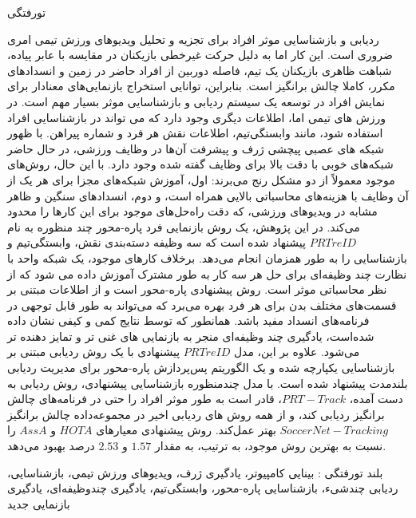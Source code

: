 

\vspace*{-60pt}
\enlargethispage{90pt}


\vspace{-1cm}

‌تورفتگی


ردیابی و ‌‌بازشناسایی موثر افراد برای تجزیه و تحلیل ویدیوهای ورزش تیمی امری ضروری است. این کار اما به دلیل حرکت غیرخطی بازیکنان در مقایسه با عابر پیاده، شباهت ظاهری بازیکنان یک تیم، فاصله دوربین از افراد حاضر در زمین و انسدادهای مکرر، کاملا چالش برانگیز است. بنابراین، توانایی استخراج بازنمایی‌های معنادار برای نمایش افراد در توسعه یک سیستم ردیابی و بازشناسایی موثر بسیار مهم است. در ورزش های تیمی اما، اطلاعات دیگری وجود دارد که می تواند در بازشناسایی افراد استفاده شود، مانند وابستگی‌تیم، اطلاعات نقش هر فرد و شماره پیراهن. با ظهور شبکه های عصبی پیچشی ژرف و پیشرفت آن‌ها در وظایف ورزشی، در حال حاضر شبکه‌های خوبی با دقت بالا برای وظایف گفته شده وجود دارد. با این حال، روش‌های موجود معمولاً از دو مشکل رنج می‌برند: اول، آموزش شبکه‌های مجزا برای هر یک از آن وظایف با هزینه‌های محاسباتی بالایی همراه است، و دوم، انسدادهای سنگین و ظاهر مشابه در ویدیوهای ورزشی، که دقت راه‌حل‌های موجود برای این کارها را محدود می‌کند. در این پژوهش، یک روش بازنمایی فرد پاره-محور چند منظوره به نام $PRTreID$ پیشنهاد شده است که سه وظیفه دسته‌بندی نقش، وابستگی‌تیم و بازشناسایی را به طور همزمان انجام می‌دهد. برخلاف کارهای موجود، یک شبکه واحد با نظارت چند وظیفه‌ای برای حل هر سه کار به طور مشترک آموزش داده می شود که از نظر محاسباتی موثر است. روش پیشنهادی پاره-محور است و از اطلاعات مبتنی بر قسمت‌های مختلف بدن برای هر فرد بهره می‌برد که می‌تواند به طور قابل توجهی در فرنامه‌های انسداد مفید باشد. همانطور که توسط نتایج کمی و کیفی نشان داده شده‌است، یادگیری چند وظیفه‌ای منجر به بازنمایی های غنی تر و تمایز دهنده تر می‌شود. علاوه بر این، مدل $PRTreID$ پیشنهادی با یک روش ردیابی مبتنی بر بازشناسایی یکپارچه شده و یک الگوریتم پس‌پردازش پاره-محور برای مدیریت ردیابی بلند‌مدت پیشنهاد شده است. با مدل چندمنظوره بازشناسایی پیشنهادی، روش ردیابی به دست آمده، $PRT-Track$، قادر است به طور موثر افراد را حتی در فرنامه‌های چالش برانگیز ردیابی کند، و از همه روش های ردیابی اخیر در مجموعه‌داده چالش برانگیز $SoccerNet-Tracking$ بهتر عمل‌کند. روش پیشنهادی معیارهای $HOTA$ و $AssA$ را نسبت به بهترین روش موجود، به ترتیب، به مقدار $1.57$ و $2.53$ درصد بهبود می‌دهد.



‌بلند
‌تورفتگی : 
بینایی کامپیوتر، یادگیری ژرف، ویدیوهای ورزش تیمی، بازشناسایی، ردیابی چندشیء، بازشناسایی پاره-محور، وابستگی‌تیم، یادگیری چندوظیفه‌ای، یادگیری بازنمایی 
‌جدید
